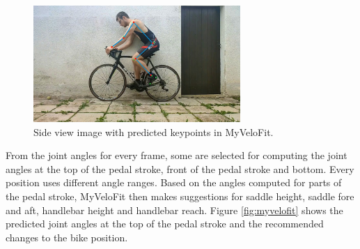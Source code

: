 \begin{figure}[htb]
    \centering
    \includegraphics[width=0.7\textwidth]{obrazky-figures/myvelofit_keypoints.jpg}
    \caption{Side view image with predicted keypoints in MyVeloFit.}
    \label{fig:myvelofit_keypoints}
\end{figure}

From the joint angles for every frame, some are selected for computing the joint angles at the top of the pedal stroke, front of the pedal stroke and bottom. Every position uses different angle ranges. Based on the angles computed for parts of the pedal stroke, MyVeloFit then makes suggestions for saddle height, saddle fore and aft, handlebar height and handlebar reach. Figure \ref{fig:myvelofit} shows the predicted joint angles at the top of the pedal stroke and the recommended changes to the bike position.


